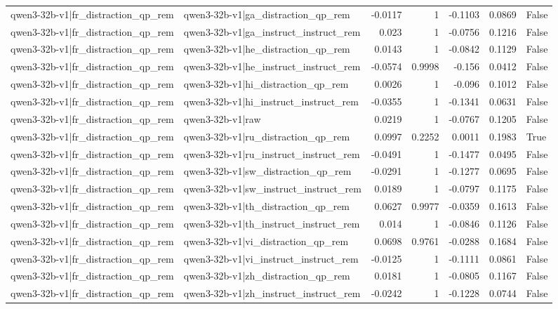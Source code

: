 \begin{table}
\begin{tabular}{l l r r r r l}
qwen3-32b-v1|fr_distraction_qp_rem & qwen3-32b-v1|ga_distraction_qp_rem & -0.0117 & 1 & -0.1103 & 0.0869 & False \\
qwen3-32b-v1|fr_distraction_qp_rem & qwen3-32b-v1|ga_instruct_instruct_rem & 0.023 & 1 & -0.0756 & 0.1216 & False \\
qwen3-32b-v1|fr_distraction_qp_rem & qwen3-32b-v1|he_distraction_qp_rem & 0.0143 & 1 & -0.0842 & 0.1129 & False \\
qwen3-32b-v1|fr_distraction_qp_rem & qwen3-32b-v1|he_instruct_instruct_rem & -0.0574 & 0.9998 & -0.156 & 0.0412 & False \\
qwen3-32b-v1|fr_distraction_qp_rem & qwen3-32b-v1|hi_distraction_qp_rem & 0.0026 & 1 & -0.096 & 0.1012 & False \\
qwen3-32b-v1|fr_distraction_qp_rem & qwen3-32b-v1|hi_instruct_instruct_rem & -0.0355 & 1 & -0.1341 & 0.0631 & False \\
qwen3-32b-v1|fr_distraction_qp_rem & qwen3-32b-v1|raw & 0.0219 & 1 & -0.0767 & 0.1205 & False \\
qwen3-32b-v1|fr_distraction_qp_rem & qwen3-32b-v1|ru_distraction_qp_rem & 0.0997 & 0.2252 & 0.0011 & 0.1983 & True \\
qwen3-32b-v1|fr_distraction_qp_rem & qwen3-32b-v1|ru_instruct_instruct_rem & -0.0491 & 1 & -0.1477 & 0.0495 & False \\
qwen3-32b-v1|fr_distraction_qp_rem & qwen3-32b-v1|sw_distraction_qp_rem & -0.0291 & 1 & -0.1277 & 0.0695 & False \\
qwen3-32b-v1|fr_distraction_qp_rem & qwen3-32b-v1|sw_instruct_instruct_rem & 0.0189 & 1 & -0.0797 & 0.1175 & False \\
qwen3-32b-v1|fr_distraction_qp_rem & qwen3-32b-v1|th_distraction_qp_rem & 0.0627 & 0.9977 & -0.0359 & 0.1613 & False \\
qwen3-32b-v1|fr_distraction_qp_rem & qwen3-32b-v1|th_instruct_instruct_rem & 0.014 & 1 & -0.0846 & 0.1126 & False \\
qwen3-32b-v1|fr_distraction_qp_rem & qwen3-32b-v1|vi_distraction_qp_rem & 0.0698 & 0.9761 & -0.0288 & 0.1684 & False \\
qwen3-32b-v1|fr_distraction_qp_rem & qwen3-32b-v1|vi_instruct_instruct_rem & -0.0125 & 1 & -0.1111 & 0.0861 & False \\
qwen3-32b-v1|fr_distraction_qp_rem & qwen3-32b-v1|zh_distraction_qp_rem & 0.0181 & 1 & -0.0805 & 0.1167 & False \\
qwen3-32b-v1|fr_distraction_qp_rem & qwen3-32b-v1|zh_instruct_instruct_rem & -0.0242 & 1 & -0.1228 & 0.0744 & False \\

\end{tabular}
\end{table}
